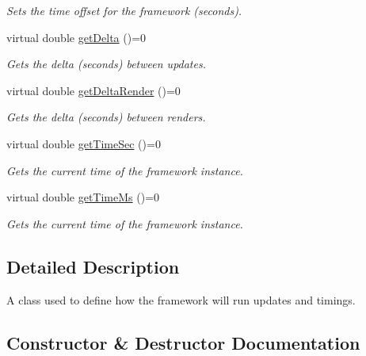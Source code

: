 \begin{DoxyCompactItemize}
\begin{DoxyCompactList}\small\item\em Sets the time offset for the framework (seconds). \end{DoxyCompactList}\item 
virtual double \hyperlink{classflounder_1_1iupdater_a1e8d40602f9799fc82d96d5b845cf796}{get\+Delta} ()=0
\begin{DoxyCompactList}\small\item\em Gets the delta (seconds) between updates. \end{DoxyCompactList}\item 
virtual double \hyperlink{classflounder_1_1iupdater_a00d7cf530cfbd7f83c8903328da14027}{get\+Delta\+Render} ()=0
\begin{DoxyCompactList}\small\item\em Gets the delta (seconds) between renders. \end{DoxyCompactList}\item 
virtual double \hyperlink{classflounder_1_1iupdater_a071086b844e1f90d7f3577e80c9c09fe}{get\+Time\+Sec} ()=0
\begin{DoxyCompactList}\small\item\em Gets the current time of the framework instance. \end{DoxyCompactList}\item 
virtual double \hyperlink{classflounder_1_1iupdater_a56548faad88ad85e0cb4bc96af0912d6}{get\+Time\+Ms} ()=0
\begin{DoxyCompactList}\small\item\em Gets the current time of the framework instance. \end{DoxyCompactList}\end{DoxyCompactItemize}


\subsection{Detailed Description}
A class used to define how the framework will run updates and timings. 



\subsection{Constructor \& Destructor Documentation}
\mbox{\label{classflounder_1_1iupdater_acbbc1766a8c236ba89ff55eee9b25850}} 
